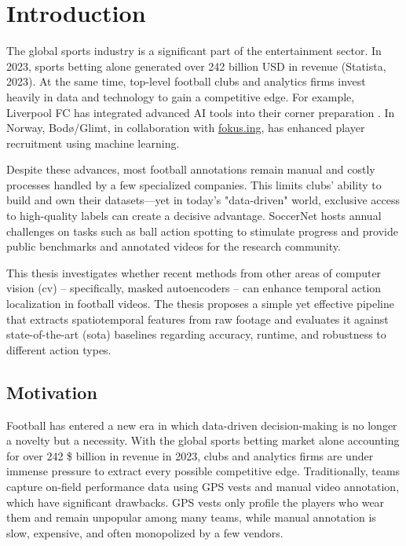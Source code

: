 \chapter{Introduction}
\label{chap:intro}

The global sports industry is a significant part of the entertainment sector. In 2023, sports betting alone generated over 242 billion USD in revenue (Statista, 2023). At the same time, top-level football clubs and analytics firms invest heavily in data and technology to gain a competitive edge. For example, Liverpool FC has integrated advanced AI tools into their corner preparation \cite{wang_tactic_ai_2024}. In Norway, Bodø/Glimt, in collaboration with \hyperlink{https://fokus.ing}{fokus.ing}, has enhanced player recruitment using machine learning.

Despite these advances, most football annotations remain manual and costly processes handled by a few specialized companies. This limits clubs' ability to build and own their datasets—yet in today's "data-driven" world, exclusive access to high-quality labels can create a decisive advantage. SoccerNet hosts annual challenges on tasks such as ball action spotting to stimulate progress and provide public benchmarks and annotated videos for the research community.

This thesis investigates whether recent methods from other areas of computer vision (\acrlong{cv}) – specifically, masked autoencoders – can enhance temporal action localization in football videos. The thesis proposes a simple yet effective pipeline that extracts spatiotemporal features from raw footage and evaluates it against state-of-the-art (\acrfull{sota}) baselines regarding accuracy, runtime, and robustness to different action types.

\section{Motivation}
Football has entered a new era in which data-driven decision-making is no longer a novelty but a necessity. With the global sports betting market alone accounting for over 242 \$ billion in revenue in 2023, clubs and analytics firms are under immense pressure to extract every possible competitive edge. Traditionally, teams capture on-field performance data using GPS vests and manual video annotation, which have significant drawbacks. GPS vests only profile the players who wear them and remain unpopular among many teams, while manual annotation is slow, expensive, and often monopolized by a few vendors.  


